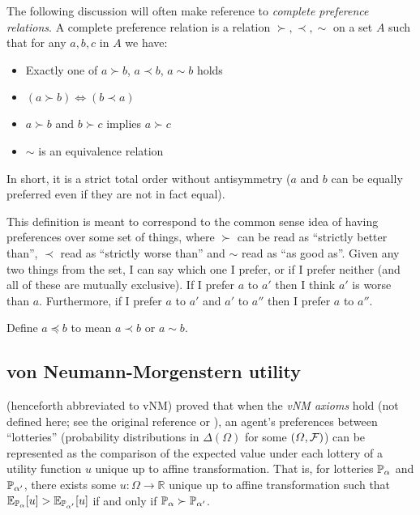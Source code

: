 The following discussion will often make reference to \emph{complete preference relations}. A complete preference relation is a relation $\succ,\prec,\sim$ on a set $A$ such that for any $a,b,c$ in $A$ we have:
\begin{itemize}
    \item Exactly one of $a\succ b$, $a\prec b$, $a\sim b$ holds
    \item $(a\succ b)\iff(b\prec a)$
    \item $a\succ b$ and $b\succ c$ implies $a\succ c$
    \item $\sim$ is an equivalence relation
\end{itemize}
In short, it is a strict total order without antisymmetry ($a$ and $b$ can be equally preferred even if they are not in fact equal).

This definition is meant to correspond to the common sense idea of having preferences over some set of things, where $\succ$ can be read as ``strictly better than'', $\prec$ read as ``strictly worse than'' and $\sim$ read as ``as good as''. Given any two things from the set, I can say which one I prefer, or if I prefer neither (and all of these are mutually exclusive). If I prefer $a$ to $a'$ then I think $a'$ is worse than $a$. Furthermore, if I prefer $a$ to $a'$ and $a'$ to $a''$ then I prefer $a$ to $a''$.

Define $a\preceq b$ to mean $a\prec b$ or $a \sim b$.

\subsection{von Neumann-Morgenstern utility}

\citet{von_neumann_theory_1944} (henceforth abbreviated to vNM) proved that when the \emph{vNM axioms} hold (not defined here; see the original reference or \citet{steele_decision_2020}), an agent's preferences between ``lotteries'' (probability distributions in $\Delta(\Omega)$ for some $(\Omega,\mathcal{F})$) can be represented as the comparison of the expected value under each lottery of a utility function $u$ unique up to affine transformation. That is, for lotteries $\mathbb{P}_\alpha$ and $\mathbb{P}_{\alpha'}$, there exists some $u:\Omega\to \mathbb{R}$ unique up to affine transformation such that $\mathbb{E}_{\mathbb{P}_\alpha}[u]> \mathbb{E}_{\mathbb{P}_{\alpha'}}[u]$ if and only if $\mathbb{P}_{\alpha} \succ \mathbb{P}_{\alpha'}$.

